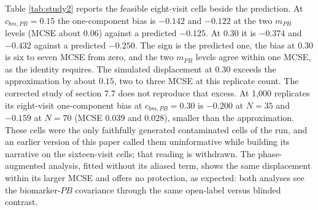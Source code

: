 \documentclass[
  11pt,
]{article}
\begin{document}
Table \ref{tab:study2} reports the feasible eight-visit cells beside the
prediction. At \(c_{bm,PB} = 0.15\) the one-component bias is
\(-0.142\) and
\(-0.122\) at the two \(m_{PB}\) levels
(MCSE about \(0.06\)) against a predicted \(-0.125\).
At \(0.30\) it is \(-0.374\) and
\(-0.432\) against a predicted
\(-0.250\). The sign is the
predicted one, the bias at \(0.30\) is six to seven MCSE from zero, and the
two \(m_{PB}\) levels agree within one MCSE, as the identity requires. The
simulated displacement at \(0.30\) exceeds the approximation by about \(0.15\),
two to three MCSE at this replicate count. The corrected study of section
7.7 does not reproduce that excess. At 1,000 replicates its eight-visit
one-component bias at \(c_{bm,PB} = 0.30\) is
\(-0.200\) at
\(N = 35\) and \(-0.159\)
at \(N = 70\) (MCSE
\(0.039\) and
\(0.028\)),
smaller than the approximation. These cells were the only faithfully
generated contaminated cells of the run, and an earlier version of
this paper called them uninformative while building its narrative on the
sixteen-visit cells; that reading is withdrawn. The phase-augmented
analysis, fitted without its aliased term, shows the same displacement
within its larger MCSE and offers no protection, as expected: both
analyses see the biomarker-\(PB\) covariance through the same open-label
versus blinded contrast.

\begin{table}[H]
\centering
\caption{\label{tab:study2}Study 2, feasible cells: eight-visit design, $N = 70$, 100 replicates per cell. Bias of the bm:Dbc coefficient against the pharmacological slope $-2.25$, with the displacement the identity predicts.}
\centering
{}
\end{table}
\end{document}
